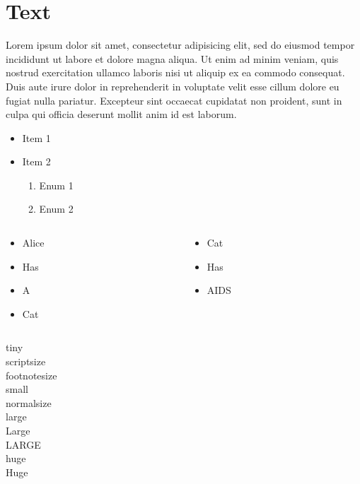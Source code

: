 {
\tableofcontents
}


\section{Text}


{
\begin{multicols}{2}
Lorem ipsum dolor sit amet, consectetur adipisicing elit, sed do eiusmod tempor incididunt ut labore et dolore magna aliqua. Ut enim ad minim veniam, quis nostrud exercitation ullamco laboris nisi ut aliquip ex ea commodo consequat. Duis aute irure dolor in reprehenderit in voluptate velit esse cillum dolore eu fugiat nulla pariatur. Excepteur sint occaecat cupidatat non proident, sunt in culpa qui officia deserunt mollit anim id est laborum.
\end{multicols}
}


{
\begin{itemize}
\item Item 1
\pause

\item Item 2
\begin{enumerate}
\item Enum 1
\item Enum 2
\end{enumerate}
\end{itemize}
}


{
\begin{columns}

\begin{column}{0.45\textwidth}
\begin{itemize}
\item Alice
\item Has
\item A
\item Cat
\end{itemize}
\end{column}

\begin{column}{0.45\textwidth}
\begin{itemize}
\item Cat
\item Has
\item AIDS
\end{itemize}
\end{column}

\end{columns}
}


{
\tiny{tiny} \\
\scriptsize{scriptsize} \\
\footnotesize{footnotesize} \\
\small{small} \\
\normalsize{normalsize} \\
\large{large} \\
\Large{Large} \\
\LARGE{LARGE} \\
\huge{huge} \\
\Huge{Huge}
}


